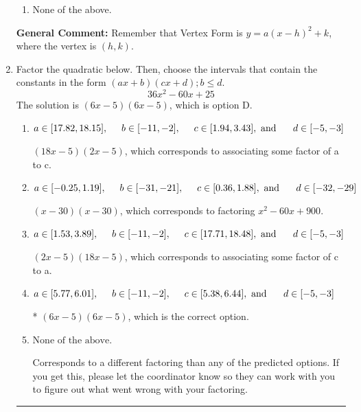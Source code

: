 \documentclass{extbook}[14pt]
\newcommand{\litem}[1]{\item #1

\rule{\textwidth}{0.4pt}}
\begin{document}
\begin{enumerate}
{\begin{enumerate}[label=\Alph*.]
\begin{multicols}{2}
\end{multicols}\item None of the above.\end{enumerate}
\textbf{General Comment:} Remember that Vertex Form is $y = a(x-h)^2+k$, where the vertex is $(h, k)$.
}
\litem{
Factor the quadratic below. Then, choose the intervals that contain the constants in the form $(ax+b)(cx+d); b \leq d.$
\[ 36x^{2} -60 x + 25 \]The solution is \( (6x -5)(6x -5) \), which is option D.\begin{enumerate}[label=\Alph*.]
\item \( a \in [17.82, 18.15], \hspace*{5mm} b \in [-11, -2], \hspace*{5mm} c \in [1.94, 3.43], \text{ and } \hspace*{5mm} d \in [-5, -3] \)

 $(18x -5)(2x -5)$, which corresponds to associating some factor of a to c.
\item \( a \in [-0.25, 1.19], \hspace*{5mm} b \in [-31, -21], \hspace*{5mm} c \in [0.36, 1.88], \text{ and } \hspace*{5mm} d \in [-32, -29] \)

 $(x -30)(x -30)$, which corresponds to factoring $x^{2} -60 x + 900$.
\item \( a \in [1.53, 3.89], \hspace*{5mm} b \in [-11, -2], \hspace*{5mm} c \in [17.71, 18.48], \text{ and } \hspace*{5mm} d \in [-5, -3] \)

 $(2x -5)(18x -5)$, which corresponds to associating some factor of c to a.
\item \( a \in [5.77, 6.01], \hspace*{5mm} b \in [-11, -2], \hspace*{5mm} c \in [5.38, 6.44], \text{ and } \hspace*{5mm} d \in [-5, -3] \)

* $(6x -5)(6x -5)$, which is the correct option.
\item \( \text{None of the above.} \)

 Corresponds to a different factoring than any of the predicted options. If you get this, please let the coordinator know so they can work with you to figure out what went wrong with your factoring.
\end{enumerate}

}
\end{enumerate}
\end{document}
